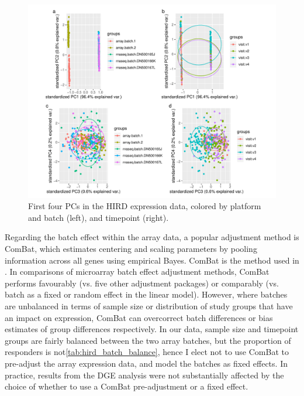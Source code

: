 \begin{figure}
    \includegraphics[width=1.0\textwidth,page=1]{mainmatter/figures/chapter_02/compare_phenotype_by_platform.E_pca.pdf}
    \caption{First four \glspl{PC} in the \gls{HIRD} expression data, colored by platform and batch (left), and timepoint (right).}
    \label{fig:hird_expression_pcs}
\end{figure}

Regarding the batch effect within the array data, a popular adjustment method is ComBat\autocite{johnson2007AdjustingBatchEffects}, which estimates centering and scaling parameters by pooling information across all genes using empirical Bayes.
ComBat is the method used in \autocite{sobolev2016AdjuvantedInfluenzaH1N1Vaccination}.
In comparisons of microarray batch effect adjustment methods, ComBat performs favourably (vs. five other adjustment packages)\autocite{chen2011RemovingBatchEffects} or comparably (vs. batch as a fixed or random effect in the linear model)\autocite{espin-perez2018ComparisonStatisticalMethods}.
However, where batches are unbalanced in terms of sample size\autocite{zhang2018AlternativeEmpiricalBayes} or distribution of study groups that have an impact on expression\autocite{nygaard2015MethodsThatRemove}, ComBat can overcorrect batch differences or bias estimates of group differences respectively.
In our data, sample size and timepoint groups are fairly balanced between the two array batches, but the proportion of responders is not\autoref{tab:hird_batch_balance}, hence I elect not to use ComBat to pre-adjust the array expression data, and model the batches as fixed effects.
In practice, results from the \gls{DGE} analysis were not substantially affected by the choice of whether to use a ComBat pre-adjustment or a fixed effect.

